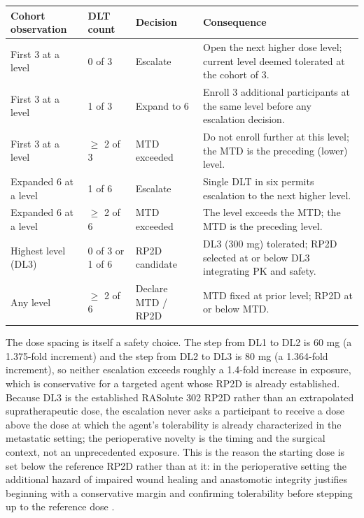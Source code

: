 \noindent\begin{tabularx}{\textwidth}{L{2.6cm} L{2.4cm} L{3.4cm} Y}
\toprule
\textbf{Cohort observation} & \textbf{DLT count} & \textbf{Decision} & \textbf{Consequence} \\
\midrule
First 3 at a level & 0 of 3 & Escalate & Open the next higher dose level; current level deemed tolerated at the cohort of 3. \\
\addlinespace
First 3 at a level & 1 of 3 & Expand to 6 & Enroll 3 additional participants at the same level before any escalation decision. \\
\addlinespace
First 3 at a level & $\geq$ 2 of 3 & MTD exceeded & Do not enroll further at this level; the MTD is the preceding (lower) level. \\
\addlinespace
Expanded 6 at a level & 1 of 6 & Escalate & Single DLT in six permits escalation to the next higher level. \\
\addlinespace
Expanded 6 at a level & $\geq$ 2 of 6 & MTD exceeded & The level exceeds the MTD; the MTD is the preceding level. \\
\addlinespace
Highest level (DL3) & 0 of 3 or 1 of 6 & RP2D candidate & DL3 (300 mg) tolerated; RP2D selected at or below DL3 integrating PK and safety. \\
\addlinespace
Any level & $\geq$ 2 of 6 & Declare MTD / RP2D & MTD fixed at prior level; RP2D at or below MTD. \\
\bottomrule
\end{tabularx}

The dose spacing is itself a safety choice. The step from DL1 to DL2 is 60 mg (a
1.375-fold increment) and the step from DL2 to DL3 is 80 mg (a 1.364-fold
increment), so neither escalation exceeds roughly a 1.4-fold increase in exposure,
which is conservative for a targeted agent whose RP2D is already established. Because
DL3 is the established RASolute 302 RP2D rather than an extrapolated supratherapeutic
dose, the escalation never asks a participant to receive a dose above the dose at
which the agent's tolerability is already characterized in the metastatic setting;
the perioperative novelty is the timing and the surgical context, not an
unprecedented exposure. This is the reason the starting dose is set below the
reference RP2D rather than at it: in the perioperative setting the additional
hazard of impaired wound healing and anastomotic integrity justifies beginning with
a conservative margin and confirming tolerability before stepping up to the
reference dose \cite{daraxwhipple,oncotrialllm}.


